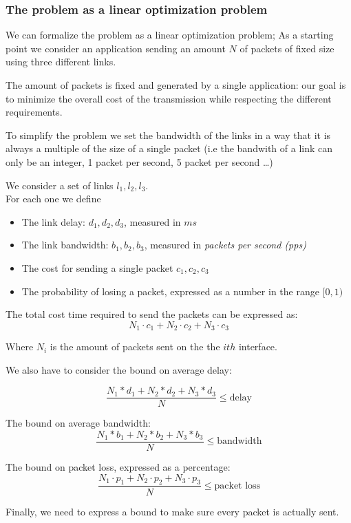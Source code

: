 \documentclass{article}
\begin{document}
\subsubsection{The problem as a linear optimization problem}

We can formalize the problem as a linear optimization problem;
As a starting point we consider an application sending an amount $N$ of packets of fixed size using three different links.

The amount of packets is fixed and generated by a single application: our goal is to minimize the overall cost of the transmission while respecting the different requirements.

To simplify the problem we set the bandwidth of the links in a way that it is always a multiple of the size of a single packet (i.e the bandwith of a link can only be an integer, 1 packet per second, 5 packet per second \dots)


We consider a set of links $l_1, l_2, l_3$. \\

For each one we define
\begin{itemize}
	\item The link delay:  $d_1, d_2, d_3$, measured in $ms$
	\item The link bandwidth: $b_1, b_2, b_3$, measured in \textit{packets per second (pps)}
	\item The cost for sending a single packet $c_1, c_2, c_3$
	\item The probability of losing a packet, expressed as a number in the range $ [0, 1)$
\end{itemize}

The total cost time required to send the packets can be expressed as:
\[
	N_1 \cdot c_1 +
	N_2 \cdot c_2 +
	N_3 \cdot c_3 
\]

Where $N_i$ is the amount of packets sent on the the $ith$ interface.

We also have to consider the bound on average delay:

\[
	\frac
	{N_1 * d_1 + N_2 * d_2  + N_3 * d_3 }
	{N}
	 \le \text{delay}
\]

The bound on average bandwidth:
\[
\frac
{N_1 * b_1 + N_2 * b_2  + N_3 * b_3 }
{N}
\le \text{bandwidth}
\]

The bound on packet loss, expressed as a percentage:
\[
\frac
{N_1 \cdot p_1 + N_2 \cdot p_2 + N_3 \cdot p_3 }
{N}
\le \text{packet loss}
\]

Finally, we need to express a bound to make sure every packet is actually sent.
\end{document}
